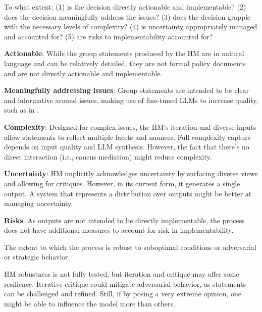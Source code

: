     \begin{evaluate}[grey]
        To what extent: (1) is the decision directly actionable and implementable? (2) does the decision meaningfully address the issues? (3) does the decision grapple with the necessary levels of complexity? (4) is uncertainty appropriately managed and accounted for? (5) are risks to implementability accounted for?
    \end{evaluate}

    \begin{noitemize}
        \item \textbf{Actionable}: While the group statements produced by the HM are in natural language and can be relatively detailed, they are not formal policy documents and are not directly actionable and implementable.
        \item \textbf{Meaningfully addressing issues}: Group statements are intended to be clear and informative around issues, making use of fine-tuned LLMs to increase quality, such as in \cite{tessler2024ai}. %
        \item \textbf{Complexity}: Designed for complex issues, the HM's iteration and diverse inputs allow statements to reflect multiple facets and nuances. Full complexity capture depends on input quality and LLM synthesis. However, the fact that there's no direct interaction (i.e., caucus mediation) might reduce complexity.
        \item \textbf{Uncertainty}: HM implicitly acknowledges uncertainty by surfacing diverse views and allowing for critiques. However, in its current form, it generates a single output. A system that represents a distribution over outputs might be better at managing uncertainty.
        \item \textbf{Risks}: As outputs are not intended to be directly implementable, the process does not have additional measures to account for risk in implementability.
    \end{noitemize}

    
    \begin{describe}[grey]
        The extent to which the process is robust to suboptimal conditions or adversarial or strategic behavior.
    \end{describe}

    HM robustness is not fully tested, but iteration and critique may offer some resilience. Iterative critique could mitigate adversarial behavior, as statements can be challenged and refined. Still, if by posing a very extreme opinion, one might be able to influence the model more than others.
    
